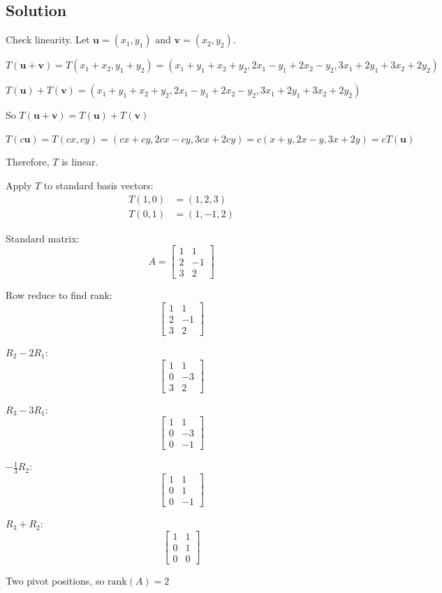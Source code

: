 \subsection*{Solution}

Check linearity. Let $\mathbf{u} = (x_1, y_1)$ and $\mathbf{v} = (x_2, y_2)$.

$T(\mathbf{u} + \mathbf{v}) = T(x_1 + x_2, y_1 + y_2) = (x_1 + y_1 + x_2 + y_2, 2x_1 - y_1 + 2x_2 - y_2, 3x_1 + 2y_1 + 3x_2 + 2y_2)$

$T(\mathbf{u}) + T(\mathbf{v}) = (x_1 + y_1 + x_2 + y_2, 2x_1 - y_1 + 2x_2 - y_2, 3x_1 + 2y_1 + 3x_2 + 2y_2)$

So $T(\mathbf{u} + \mathbf{v}) = T(\mathbf{u}) + T(\mathbf{v})$

$T(c\mathbf{u}) = T(cx, cy) = (cx + cy, 2cx - cy, 3cx + 2cy) = c(x + y, 2x - y, 3x + 2y) = cT(\mathbf{u})$

Therefore, $T$ is linear.

Apply $T$ to standard basis vectors:
\begin{align*}
	T(1,0) &= (1, 2, 3) \\
	T(0,1) &= (1, -1, 2)
\end{align*}

Standard matrix:
\[
	A = \begin{bmatrix}
		1 & 1 \\
		2 & -1 \\
		3 & 2
	\end{bmatrix}
\]

Row reduce to find rank:
\[
	\begin{bmatrix}
		1 & 1 \\
		2 & -1 \\
		3 & 2
	\end{bmatrix}
\]

$R_2 - 2R_1$:
\[
	\begin{bmatrix}
		1 & 1 \\
		0 & -3 \\
		3 & 2
	\end{bmatrix}
\]

$R_3 - 3R_1$:
\[
	\begin{bmatrix}
		1 & 1 \\
		0 & -3 \\
		0 & -1
	\end{bmatrix}
\]

$-\frac{1}{3}R_2$:
\[
	\begin{bmatrix}
		1 & 1 \\
		0 & 1 \\
		0 & -1
	\end{bmatrix}
\]

$R_3 + R_2$:
\[
	\begin{bmatrix}
		1 & 1 \\
		0 & 1 \\
		0 & 0
	\end{bmatrix}
\]

Two pivot positions, so $\text{rank}(A) = 2$
